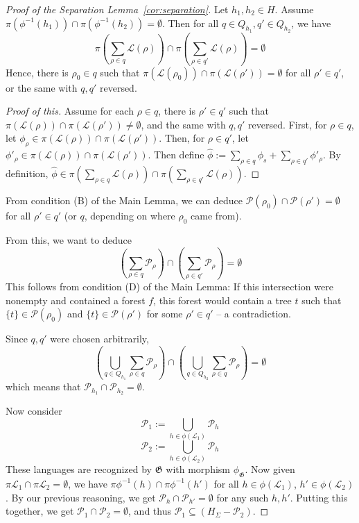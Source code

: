 \documentclass[sigplan,9pt]{acmart}\settopmatter{printfolios=true,printccs=false,printacmref=false}
\theoremstyle{definition}
\newcommand{\La}[0]{{\mathcal{L}}}
\newcommand{\Gg}[0]{{\mathfrak{G}}}
\newcommand{\Pa}[0]{{\mathcal{P}}}
\begin{document}
\begin{proof}[Proof of the Separation Lemma~\ref{cor:separation}]
Let $h_1, h_2 \in H$.
Assume $\pi(\phi^{-1}(h_1)) \cap \pi(\phi^{-1}(h_2)) = \emptyset$.
Then for all $q \in Q_{h_1}, q' \in Q_{h_2}$, we have
$$\pi\left(\sum_{\rho \in q} \La(\rho)\right) \cap \pi\left(\sum_{\rho \in q'} \La(\rho)\right) = \emptyset$$
Hence, there is $\rho_0 \in q$ such that $\pi(\La(\rho_0)) \cap \pi(\La(\rho')) = \emptyset$ for all $\rho' \in q'$, or the same with $q, q'$ reversed.
\begin{leftbar}
\begin{proof}[Proof of this]
Assume for each $\rho \in q$, there is $\rho' \in q'$ such that $\pi(\La(\rho)) \cap \pi(\La(\rho')) \neq \emptyset$, and the same with $q,q'$ reversed.
First, for $\rho \in q$, let $\phi_\rho \in \pi(\La(\rho)) \cap \pi(\La(\rho'))$.
Then, for $\rho \in q'$, let $\phi'_\rho \in \pi(\La(\rho)) \cap \pi(\La(\rho'))$.
Then define $\widehat\phi := \sum_{\rho\in q} \phi_s + \sum_{\rho \in q'} \phi'_\rho$.
By definition,
$\widehat\phi \in \pi\left(\sum_{\rho \in q} \La(\rho)\right) \cap \pi\left(\sum_{\rho \in q'} \La(\rho)\right)$.
\end{proof}
\end{leftbar}
From condition (B) of the Main Lemma, we can deduce $\Pa(\rho_0) \cap \Pa(\rho') = \emptyset$ for all $\rho' \in q'$ (or $q$, depending on where $\rho_0$ came from). 

From this, we want to deduce
$$\left(\sum_{\rho \in q} \Pa_\rho\right) \cap \left(\sum_{\rho \in q'} \Pa_\rho\right) = \emptyset$$
This follows from condition (D) of the Main Lemma: If this intersection were nonempty and contained a forest $f$, this forest would contain a tree $t$ such that $\{t\} \in \Pa(\rho_0)$ and $\{t\} \in \Pa(\rho')$ for some $\rho' \in q'$ -- a contradiction.

Since $q, q'$ were chosen arbitrarily,
$$\left(\bigcup_{q \in Q_{h_1}} \sum_{\rho \in q} \Pa_\rho\right) \cap \left(\bigcup_{q \in Q_{h_2}} \sum_{\rho \in q} \Pa_\rho\right) = \emptyset$$
which means that $\Pa_{h_1} \cap \Pa_{h_2} = \emptyset$.

Now consider
$$\Pa_1 := \bigcup_{h \in \phi(\La_1)} \Pa_h$$
$$\Pa_2 := \bigcup_{h \in \phi(\La_2)} \Pa_h$$
These languages are recognized by $\Gg$ with morphism $\phi_\Gg$.
Now given $\pi\La_1 \cap \pi\La_2 = \emptyset$, we have $\pi\phi^{-1}(h) \cap \pi\phi^{-1}(h')$ for all $h \in \phi(\La_1)$, $h' \in \phi(\La_2)$.
By our previous reasoning, we get $\Pa_h \cap \Pa_{h'} = \emptyset$ for any such $h, h'$.
Putting this together, we get $\Pa_1 \cap \Pa_2 = \emptyset$, and thus $\Pa_1 \subseteq \left(H_\Sigma - \Pa_2\right)$.



\end{proof}
\end{document}
